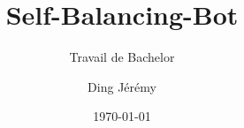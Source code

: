 \author{Ding Jérémy}


\title{Self-Balancing-Bot}

\subtitle{Travail de Bachelor}


\date{\today}


